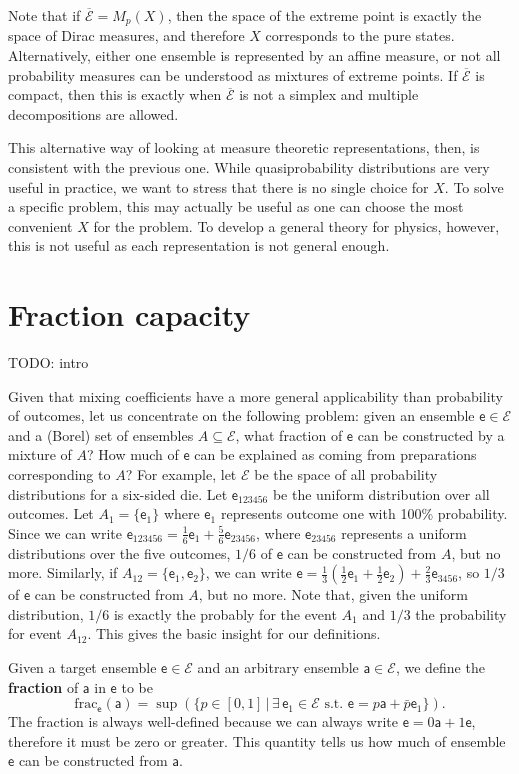\documentclass[10pt,twocolumn, nofootinbib]{revtex4-2}
\newcommand\fraction{\mathrm{frac}}
\newcommand{\ens}[1][e] {\mathsf{#1}} %
\newcommand{\Ens}[1][E] {\mathcal{#1}} %
\begin{document}
Note that if $\overline{\Ens} = M_p(X)$, then the space of the extreme point is exactly the space of Dirac measures, and therefore $X$ corresponds to the pure states. Alternatively, either one ensemble is represented by an affine measure, or not all probability measures can be understood as mixtures of extreme points. If $\overline{\Ens}$ is compact, then this is exactly when $\overline{\Ens}$ is not a simplex and multiple decompositions are allowed.

This alternative way of looking at measure theoretic representations, then, is consistent with the previous one. While quasiprobability distributions are very useful in practice, we want to stress that there is no single choice for $X$. To solve a specific problem, this may actually be useful as one can choose the most convenient $X$ for the problem. To develop a general theory for physics, however, this is not useful as each representation is not general enough.

\section{Fraction capacity}

TODO: intro

Given that mixing coefficients have a more general applicability than probability of outcomes, let us concentrate on the following problem: given an ensemble $\ens \in \Ens$ and a (Borel) set of ensembles $A \subseteq \Ens$, what fraction of $\ens$ can be constructed by a mixture of $A$? How much of $\ens$ can be explained as coming from preparations corresponding to $A$? For example, let $\Ens$ be the space of all probability distributions for a six-sided die. Let $\ens_{123456}$ be the uniform distribution over all outcomes. Let $A_1 = \{\ens_1\}$ where $\ens_1$ represents outcome one with 100\% probability. Since we can write $\ens_{123456} = \frac{1}{6} \ens_{1} + \frac{5}{6} \ens_{23456}$, where $\ens_{23456}$ represents a uniform distributions over the five outcomes, $1/6$ of $\ens$ can be constructed from $A$, but no more. Similarly, if $A_{12} = \{\ens_{1},\ens_{2}\}$, we can write $\ens = \frac{1}{3} \left(\frac{1}{2} \ens_1 + \frac{1}{2} \ens_2 \right)  + \frac{2}{3} \ens_{3456}$, so $1/3$ of $\ens$ can be constructed from $A$, but no more. Note that, given the uniform distribution, $1/6$ is exactly the probably for the event $A_1$ and $1/3$ the probability for event $A_{12}$. This gives the basic insight for our definitions.

Given a target ensemble $\ens \in \Ens$ and an arbitrary ensemble $\ens[a] \in \Ens$, we define the \textbf{fraction} of $\ens[a]$ in $\ens$ to be
\begin{equation}
	\fraction_{\ens}(\ens[a]) = \sup(\{ p \in [0,1] \, | \, \exists \, \ens_1 \in \Ens \text{ s.t. }  \ens = p \ens[a] + \bar{p} \ens_1 \}).
\end{equation}
The fraction is always well-defined because we can always write $\ens = 0 \ens[a] + 1 \ens$, therefore it must be zero or greater. This quantity tells us how much of ensemble $\ens$ can be constructed from $\ens[a]$. 
\end{document}
